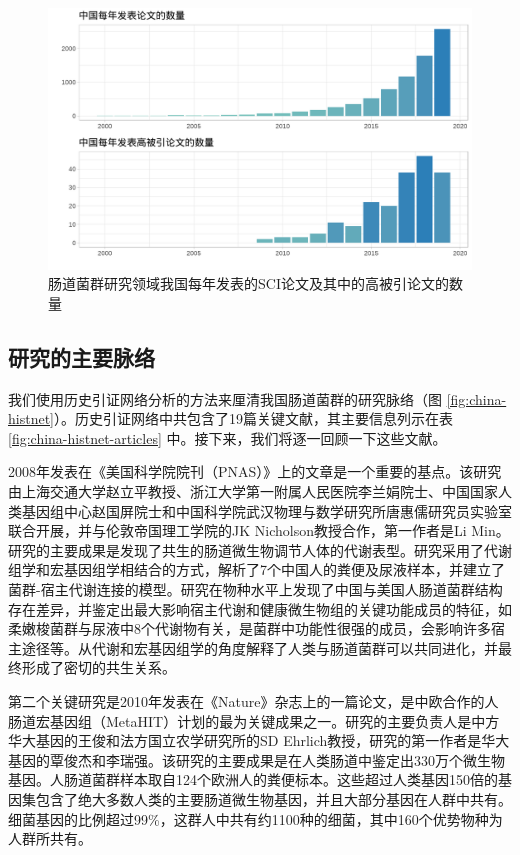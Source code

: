 \documentclass[]{ctexbook}
\begin{document}
\begin{figure}
\includegraphics[width=1\linewidth]{plots/china-publication-number-1} \caption{肠道菌群研究领域我国每年发表的SCI论文及其中的高被引论文的数量}\label{fig:china-publication-number}
\end{figure}

\hypertarget{ux7814ux7a76ux7684ux4e3bux8981ux8109ux7edc}{%
\subsection{研究的主要脉络}\label{ux7814ux7a76ux7684ux4e3bux8981ux8109ux7edc}}

我们使用历史引证网络分析的方法来厘清我国肠道菌群的研究脉络（图 \ref{fig:china-histnet}）。历史引证网络中共包含了19篇关键文献，其主要信息列示在表 \ref{fig:china-histnet-articles} 中。接下来，我们将逐一回顾一下这些文献。

2008年发表在《美国科学院院刊（PNAS）》上的文章是一个重要的基点。该研究由上海交通大学赵立平教授、浙江大学第一附属人民医院李兰娟院士、中国国家人类基因组中心赵国屏院士和中国科学院武汉物理与数学研究所唐惠儒研究员实验室联合开展，并与伦敦帝国理工学院的JK Nicholson教授合作，第一作者是Li Min。研究的主要成果是发现了共生的肠道微生物调节人体的代谢表型。研究采用了代谢组学和宏基因组学相结合的方式，解析了7个中国人的粪便及尿液样本，并建立了菌群-宿主代谢连接的模型。研究在物种水平上发现了中国与美国人肠道菌群结构存在差异，并鉴定出最大影响宿主代谢和健康微生物组的关键功能成员的特征，如柔嫩梭菌群与尿液中8个代谢物有关，是菌群中功能性很强的成员，会影响许多宿主途径等。从代谢和宏基因组学的角度解释了人类与肠道菌群可以共同进化，并最终形成了密切的共生关系。

第二个关键研究是2010年发表在《Nature》杂志上的一篇论文，是中欧合作的人肠道宏基因组（MetaHIT）计划的最为关键成果之一。研究的主要负责人是中方华大基因的王俊和法方国立农学研究所的SD Ehrlich教授，研究的第一作者是华大基因的覃俊杰和李瑞强。该研究的主要成果是在人类肠道中鉴定出330万个微生物基因。人肠道菌群样本取自124个欧洲人的粪便标本。这些超过人类基因150倍的基因集包含了绝大多数人类的主要肠道微生物基因，并且大部分基因在人群中共有。细菌基因的比例超过99\%，这群人中共有约1100种的细菌，其中160个优势物种为人群所共有。
\end{document}
